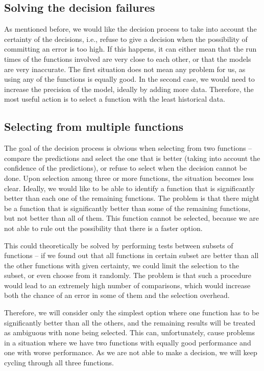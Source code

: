 \subsection{Solving the decision failures}
\label{subsec:solving_decision_failures}

As mentioned before, we would like the decision process to take into account the certainty of the decisions, i.e., refuse to give a decision when the possibility of committing an error is too high. If this happens, it can either mean that the run times of the functions involved are very close to each other, or that the models are very inaccurate. The first situation does not mean any problem for us, as using any of the functions is equally good. In the second case, we would need to increase the precision of the model, ideally by adding more data. Therefore, the most useful action is to select a function with the least historical data. 

\subsection{Selecting from multiple functions}
\label{subsec:selecting_multiple_function}

The goal of the decision process is obvious when selecting from two functions -- compare the predictions and select the one that is better (taking into account the confidence of the predictions), or refuse to select when the decision cannot be done. Upon selection among three or more functions, the situation becomes less clear. Ideally, we would like to be able to identify a function that is significantly better than each one of the remaining functions. The problem is that there might be a function that is significantly better than some of the remaining functions, but not better than all of them. This function cannot be selected, because we are not able to rule out the possibility that there is a faster option.

This could theoretically be solved by performing tests between subsets of functions -- if we found out that all functions in certain subset are better than all the other functions with given certainty, we could limit the selection to the subset, or even choose from it randomly. The problem is that such a procedure would lead to an extremely high number of comparisons, which would increase both the chance of an error in some of them and the selection overhead.

Therefore, we will consider only the simplest option where one function has to be significantly better than all the others, and the remaining results will be treated as ambiguous with none being selected. This can, unfortunately, cause problems in a situation where we have two functions with equally good performance and one with worse performance. As we are not able to make a decision, we will keep cycling through all three functions.

